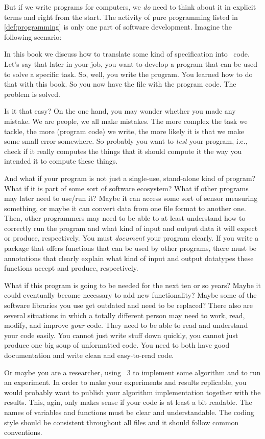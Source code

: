 But if we write programs for computers, we \emph{do} need to think about it in explicit terms and right from the start.
The activity of pure programming listed in \cref{def:programming} is only one part of software development.
Imagine the following scenario:

In this book we discuss how to translate some kind of specification into \python\ code.
Let's say that later in your job, you want to develop a program that can be used to solve a specific task.
So, well, you write the program.
You learned how to do that with this book.
So you now have the file with the program code.
The problem is solved.

Is it that easy?
On the one hand, you may wonder whether you made any mistake.
We are people, we all make mistakes.
The more complex the task we tackle, the more (program code) we write, the more likely it is that we make some small error somewhere.
So probably you want to \emph{test} your program, i.e., check if it really computes the things that it should compute it the way you intended it to compute these things.

And what if your program is not just a single-use, stand-alone kind of program?
What if it is part of some sort of software ecosystem?
What if other programs may later need to use/run it?
Maybe it can access some sort of sensor measuring something, or maybe it can convert data from one file format to another one.
Then, other programmers may need to be able to at least understand how to correctly run the program and what kind of input and output data it will expect or produce, respectively.
You must \emph{document} your program clearly.
If you write a package that offers functions that can be used by other programs, there must be annotations that clearly explain what kind of input and output datatypes these functions accept and produce, respectively.

What if this program is going to be needed for the next ten or so years?
Maybe it could eventually become necessary to add new functionality?
Maybe some of the software libraries you use get outdated and need to be replaced?
There also are several situations in which a totally different person may need to work, read, modify, and improve \emph{your} code.
They need to be able to read and understand your code easily.
You cannot just write stuff down quickly, you cannot just produce one big soup of unformatted code.
You need to both have good documentation and write clean and easy-to-read code.

Or maybe you are a researcher, using \python~3 to implement some algorithm and to run an experiment.
In order to make your experiments and results replicable, you would probably want to publish your algorithm implementation together with the results.
This, agin, only makes sense if your code is at least a bit readable.
The names of variables and functions must be clear and understandable.
The coding style should be consistent throughout all files and it should follow common conventions.


